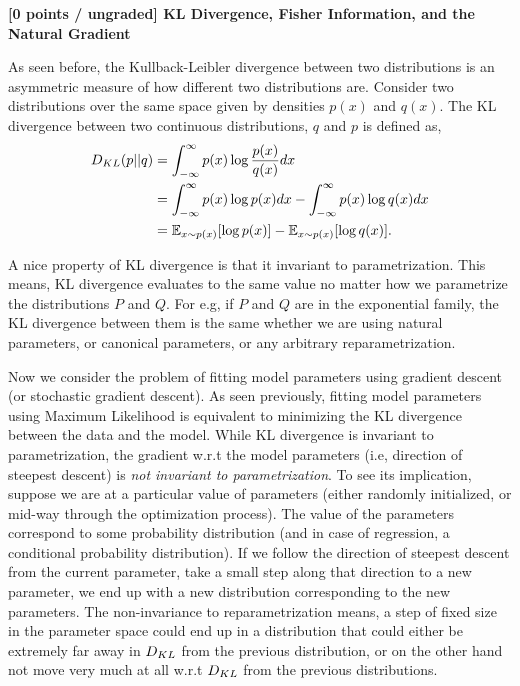 \newcommand{\argminE}{\mathop{\mathrm{argmi\di}}\limits}          %
\newcommand{\argmaxE}{\mathop{\mathrm{argmax}}\limits}          %

\item {\bf [0 points / ungraded] KL Divergence, Fisher Information, and the Natural Gradient}

As seen before, the Kullback-Leibler divergence between two distributions is an asymmetric measure of how different two distributions are. Consider two distributions over the same space given by densities $p(x)$ and $q(x)$. The KL divergence between two continuous distributions, $q$ and $p$ is defined as,
 \begin{align*}
D_{KL}(p||q)&=\int_{-\infty}^{\infty}p(x)\log\dfrac{p(x)}{q(x)}dx\\
&=\int_{-\infty}^{\infty}p(x)\log p(x)dx-\int_{-\infty}^{\infty}p(x)\log q(x)dx\\
&=\mathbb{E}_{x\sim p(x)}[\log p(x)]-\mathbb{E}_{x\sim p(x)}[\log q(x)].
\end{align*}


A nice property of KL divergence is that it invariant to parametrization. This means, KL divergence
evaluates to the same value no matter how we parametrize the distributions $P$ and $Q$. For e.g,
if $P$ and $Q$ are in the exponential family, the KL divergence between them is the same whether
we are using natural parameters, or canonical parameters, or any arbitrary reparametrization.


Now we consider the problem of fitting model parameters using gradient descent (or stochastic gradient
descent). As seen previously, fitting model parameters using Maximum Likelihood is equivalent
to minimizing the KL divergence between the data and the model. While KL divergence is
invariant to parametrization, the gradient w.r.t the model parameters (i.e, direction
of steepest descent) is \emph{not invariant to parametrization}. To see its implication, suppose
we are at a particular value of parameters (either randomly initialized, or mid-way through
the optimization process). The value of the parameters correspond to some probability distribution
(and in case of regression, a conditional probability distribution).
If we follow the direction of steepest descent from the current parameter, take a small step along that
direction to a new parameter, we end up with a new distribution corresponding to the new parameters.
The non-invariance to reparametrization means, a step of fixed size in the parameter space could
end up in a distribution that could either be extremely far away in $D_{KL}$ from the previous
distribution, or on the other hand not move very much at all w.r.t $D_{KL}$ from the previous
distributions.



